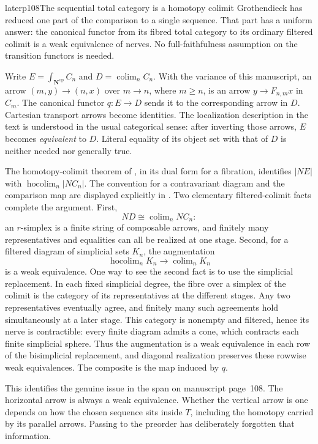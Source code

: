 \begin{dcomment}{later}{p108}{The sequential total category is a homotopy colimit}
Grothendieck has reduced one part of the comparison to a single sequence. That part has a uniform answer: the canonical functor from its fibred total category to its ordinary filtered colimit is a weak equivalence of nerves. No full-faithfulness assumption on the transition functors is needed.

Write $E=\int_{\mathbf N^{\mathrm{op}}} C_n$ and $D=\mathop{\mathrm{colim}}_n C_n$. With the variance of this manuscript, an arrow $(m,y)\to(n,x)$ over $m\to n$, where $m\ge n$, is an arrow $y\to F_{n,m}x$ in $C_m$. The canonical functor $q:E\to D$ sends it to the corresponding arrow in $D$. Cartesian transport arrows become identities. The localization description in the text is understood in the usual categorical sense: after inverting those arrows, $E$ becomes \emph{equivalent} to $D$. Literal equality of its object set with that of $D$ is neither needed nor generally true.

The homotopy-colimit theorem of \citet[Theorem~1.2]{Thomason1979}, in its dual form for a fibration, identifies $|NE|$ with $\operatorname{hocolim}_n|NC_n|$. The convention for a contravariant diagram and the comparison map are displayed explicitly in \citet[\S3, equation~(9)]{Cegarra2020}. Two elementary filtered-colimit facts complete the argument. First,
\[
 N D\cong\mathop{\mathrm{colim}}_n NC_n:
\]
an $r$-simplex is a finite string of composable arrows, and finitely many representatives and equalities can all be realized at one stage. Second, for a filtered diagram of simplicial sets $K_n$, the augmentation
\[
 \operatorname{hocolim}_n K_n\longrightarrow
 \mathop{\mathrm{colim}}_n K_n
\]
is a weak equivalence. One way to see the second fact is to use the simplicial replacement. In each fixed simplicial degree, the fibre over a simplex of the colimit is the category of its representatives at the different stages. Any two representatives eventually agree, and finitely many such agreements hold simultaneously at a later stage. This category is nonempty and filtered, hence its nerve is contractible: every finite diagram admits a cone, which contracts each finite simplicial sphere. Thus the augmentation is a weak equivalence in each row of the bisimplicial replacement, and diagonal realization preserves these rowwise weak equivalences. The composite is the map induced by $q$.

This identifies the genuine issue in the span on manuscript page~108. The horizontal arrow is always a weak equivalence. Whether the vertical arrow is one depends on how the chosen sequence sits inside $T$, including the homotopy carried by its parallel arrows. Passing to the preorder has deliberately forgotten that information.
\end{dcomment}

